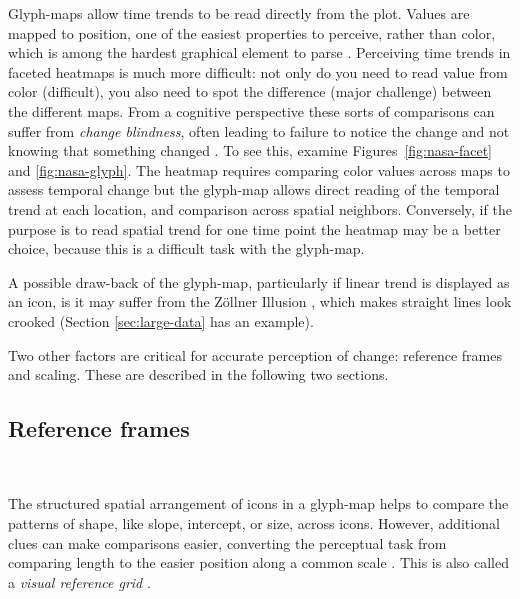 \documentclass[oneside]{article}
\begin{document}
Glyph-maps allow time trends to be read directly from the plot. Values are mapped to position, one of the easiest properties to perceive, rather than color, which is among the hardest graphical element to parse \citep{cleveland:1984}. Perceiving time trends in faceted heatmaps is much more difficult: not only do you need to read value from color (difficult), you also need to spot the difference (major challenge) between the different maps. From a cognitive perspective these sorts of comparisons can suffer from \emph{change blindness}, often leading to failure to notice the change and not knowing that something changed \citep{healey:2011,busey}. To see this, examine Figures~\ref{fig:nasa-facet} and \ref{fig:nasa-glyph}. The heatmap requires comparing color values across maps to assess temporal change but the glyph-map allows direct reading of the temporal trend at each location, and comparison across spatial neighbors. Conversely, if the purpose is to read spatial trend for one time point the heatmap may be a better choice, because this is a difficult task with the glyph-map. 


A possible draw-back of the glyph-map, particularly if linear trend is displayed as an icon, is it may suffer from the Z\"ollner Illusion \citep{Zollner}, which makes straight lines look crooked (Section \ref{sec:large-data} has an example).

Two other factors are critical for accurate perception of change: reference frames and scaling. These are described in the following two sections.

\subsection{Reference frames}~\label{sec:reference}

The structured spatial arrangement of icons in a glyph-map helps to compare the patterns of shape, like slope, intercept, or size, across icons. However, additional clues can make comparisons easier, converting the perceptual task from comparing length to the easier position along a common scale \citep{cleveland:1984}. This is also called a \emph{visual reference grid} \citep{cleveland:1993a}.
\end{document}
